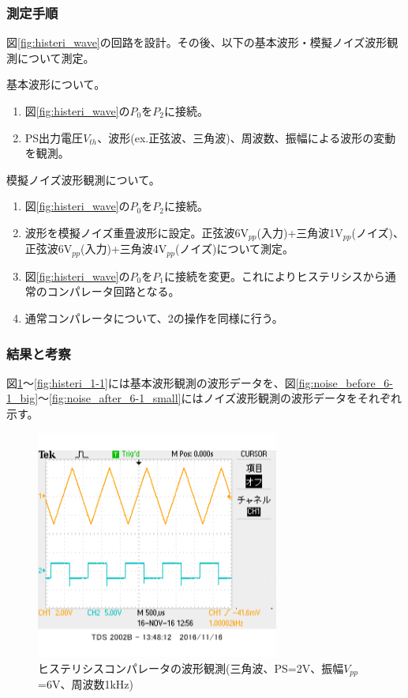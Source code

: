 \documentclass[11pt,a4j]{jsarticle}
\begin{document}
   \subsubsection{測定手順}
    図\ref{fig:histeri_wave}の回路を設計。その後、以下の基本波形・模擬ノイズ波形観測について測定。
    
    基本波形について。
    \begin{enumerate}
    \item 図\ref{fig:histeri_wave}の$P_0$を$P_2$に接続。
    \item PS出力電圧$V_{th}$、波形(ex.正弦波、三角波)、周波数、振幅による波形の変動を観測。
    \end{enumerate}
    
    模擬ノイズ波形観測について。
    \begin{enumerate}
    \item 図\ref{fig:histeri_wave}の$P_0$を$P_2$に接続。
    \item 波形を模擬ノイズ重畳波形に設定。正弦波6V$_{pp}$(入力)+三角波1V$_{pp}$(ノイズ)、正弦波6V$_{pp}$(入力)+三角波4V$_{pp}$(ノイズ)について測定。
    \item 図\ref{fig:histeri_wave}の$P_0$を$P_1$に接続を変更。これによりヒステリシスから通常のコンパレータ回路となる。
    \item 通常コンパレータについて、2の操作を同様に行う。
    \end{enumerate}
    
   \subsubsection{結果と考察}
    
    図\ref{fig:histeri_2-1}～\ref{fig:histeri_1-1}には基本波形観測の波形データを、図\ref{fig:noise_before_6-1_big}～\ref{fig:noise_after_6-1_small}にはノイズ波形観測の波形データをそれぞれ示す。
    
    \begin{figure}[htbp]
  \centering
  \includegraphics[width=8cm,clip]{1_2_histeri_Vth2f1V6sankaku_ViVo.png}
  \caption{ヒステリシスコンパレータの波形観測(三角波、PS=2V、振幅$V_{pp}$=6V、周波数1kHz)}
  \label{fig:histeri_2-1}
 \end{figure}
 
\end{document}

